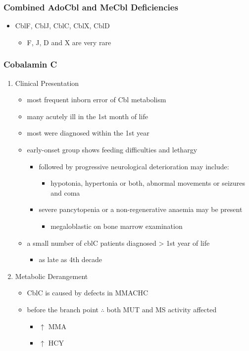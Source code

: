 \documentclass[12pt]{scrartcl}
\begin{document}
\subsubsection{Combined AdoCbl and MeCbl Deficiencies}
\label{sec:orgd23a02d}
\begin{itemize}
\item CblF, CblJ, CblC, CblX, CblD
\begin{itemize}
\item F, J, D and X are very rare
\end{itemize}
\end{itemize}
\subsubsection{Cobalamin C}
\label{sec:org5bfec09}
\begin{enumerate}
\item Clinical Presentation
\label{sec:org9357d15}
\begin{itemize}
\item most frequent inborn error of Cbl metabolism
\item many acutely ill in the 1st month of life
\item most were diagnosed within the 1st year
\item early-onset group shows feeding difficulties and lethargy
\begin{itemize}
\item followed by progressive neurological deterioration may include: 
\begin{itemize}
\item hypotonia, hypertonia or both, abnormal movements or seizures
and coma
\end{itemize}
\item severe pancytopenia or a non-regenerative anaemia may be present
\begin{itemize}
\item megaloblastic on bone marrow examination
\end{itemize}
\end{itemize}
\item a small number of cblC patients diagnosed \textgreater{} 1st year of life
\begin{itemize}
\item as late as 4th decade
\end{itemize}
\end{itemize}

\item Metabolic Derangement
\label{sec:org4348ceb}
\begin{itemize}
\item CblC is caused by defects in MMACHC
\item before the branch point \(\therefore\) both MUT and MS activity affected
\begin{itemize}
\item \(\uparrow\) MMA
\item \(\uparrow\) HCY
\end{itemize}
\end{itemize}


\end{enumerate}
\end{document}
